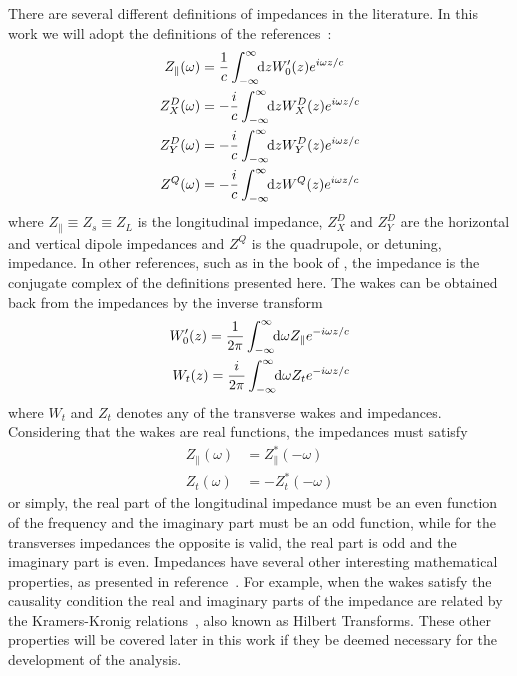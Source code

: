     There are several different definitions of impedances in the literature. In this work we will adopt the definitions of the references~\cite{Chao1993, Stupakov2000a, Heifets1991}:
    \begin{align}\label{eq:impedances_definition}
        \begin{aligned}
      	  	Z_\parallel(\omega) &= \frac1c \infint{z}{W'_0(z)e^{i\omega z/c}}\\
          	Z^D_X(\omega) &= -\frac{i}{c} \infint{z}{W^D_X(z)e^{i\omega z/c}}\\
          	Z^D_Y(\omega) &= -\frac{i}{c} \infint{z}{W^D_Y(z)e^{i\omega z/c}}\\
          	Z^Q(\omega) &= -\frac{i}{c} \infint{z}{W^Q(z)e^{i\omega z/c}}
        \end{aligned}
    \end{align}
    where $Z_\parallel \equiv Z_s \equiv Z_L$ is the longitudinal impedance, $Z^D_X$ and $Z^D_Y$ are the horizontal and vertical dipole impedances and $Z^Q$ is the quadrupole, or detuning, impedance. In other references, such as in the book of , the impedance is the conjugate complex of the definitions presented here. The wakes can be obtained back from the impedances by the inverse transform
    \begin{align}\label{eq:wake_as_impedance}
	  	\begin{aligned}
            W'_0(z) = \frac{1}{2\pi}\int_{-\infty}^{\infty}\!\!\text{d}\omega Z_\parallel e^{-i\omega z/c}\\
            W_t(z) = \frac{i}{2\pi}\int_{-\infty}^{\infty}\!\!\text{d}\omega Z_t e^{-i\omega z/c}
        \end{aligned}
    \end{align}
    where $W_t$ and $Z_t$ denotes any of the transverse wakes and impedances. Considering that the wakes are real functions, the impedances must satisfy
    \begin{subequations}\label{eq:impedance_even_odd}
    \begin{align}\label{eq:impedance_even_odd_long}
  	  	Z_\parallel(\omega) &= Z_\parallel^*(-\omega)\\\label{eq:impedance_even_odd_trans}
	  	Z_t(\omega) &= -Z_t^*(-\omega)
    \end{align}
    \end{subequations}
    or simply, the real part of the longitudinal impedance must be an even function of the frequency and the imaginary part must be an odd function, while for the transverses impedances the opposite is valid, the real part is odd and the imaginary part is even. Impedances have several other interesting mathematical properties, as presented in reference~\cite{Chao1993}. For example, when the wakes satisfy the causality condition the real and imaginary parts of the impedance are related by the Kramers-Kronig relations~\cite{Kronig1926}, also known as Hilbert Transforms. These other properties will be covered later in this work if they be deemed necessary for the development of the analysis.

